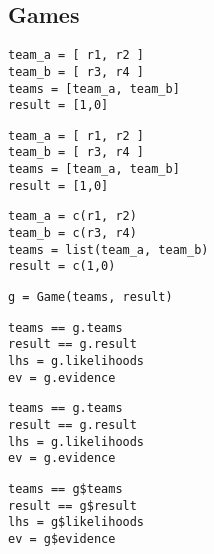 \documentclass[article]{jss}
\newif\ifen
\newcommand{\en}[1]{\ifen#1\fi}
\begin{document}
\subsection{Games}

\en{La clase \texttt{Game()} se utiliza para computar los posteriors y la evidencia de modelos causales como los descrito en la figura~\ref{fig:generative_model}.}
%
\en{A modo de ejemplo, inicializamos una partida con dos equipos de dos jugadores.}
%
\begin{paracol}{3}
\begin{lstlisting}[backgroundcolor=\color{julia}, belowskip=-0.77 \baselineskip]
team_a = [ r1, r2 ]
team_b = [ r3, r4 ]
teams = [team_a, team_b]
result = [1,0]
\end{lstlisting}
  \switchcolumn
\begin{lstlisting}[backgroundcolor=\color{python}, belowskip=-0.77 \baselineskip]
team_a = [ r1, r2 ]
team_b = [ r3, r4 ]
teams = [team_a, team_b]
result = [1,0]
\end{lstlisting}
   \switchcolumn
\begin{lstlisting}[backgroundcolor=\color{r}, belowskip=-0.77 \baselineskip]
team_a = c(r1, r2)
team_b = c(r3, r4)
teams = list(team_a, team_b)
result = c(1,0)
\end{lstlisting}  
\end{paracol}
\begin{lstlisting}[backgroundcolor=\color{all}]
g = Game(teams, result)
\end{lstlisting}
%
\en{Sus principales atributos, además de los equipos y el resultado, son los likelihoods Gaussianos y la evidencia.}
%
\begin{paracol}{3}
\begin{lstlisting}[backgroundcolor=\color{julia}]
teams == g.teams
result == g.result
lhs = g.likelihoods
ev = g.evidence
\end{lstlisting}
  \switchcolumn
\begin{lstlisting}[backgroundcolor=\color{python}]
teams == g.teams
result == g.result
lhs = g.likelihoods
ev = g.evidence
\end{lstlisting}
   \switchcolumn
\begin{lstlisting}[backgroundcolor=\color{r}]
teams == g$teams
result == g$result
lhs = g$likelihoods
ev = g$evidence
\end{lstlisting}  
\end{paracol}
%
 \en{En presencia de equipos, el resultado observado se modela como consecuencias directa de la diferencia de la suma de los rendimientos de cada equipo, $d = t_a - t_b$.}
\end{document}
